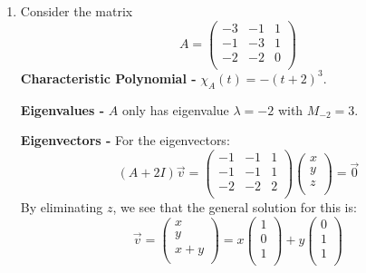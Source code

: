 \documentclass[../main.tex]{subfiles}
\begin{document}
\begin{example}
\begin{enumerate}
    From \textbf{iii}, we know the rotation in the plane has eigenvalues $e^{\pm i \theta}$.
    Provided $\theta \neq n\pi$, these are distinct and a complex conjugate pair so each have algebraic multiplicity and geometric multiplicity 1.
    Otherwise, if $\theta = n\pi$, then all vectors on the plane are eigenvectors with eigenvalue $\lambda = -1$ so $m_{-1} = 2$ and algebraic multiplicity $M_{-1} = 2$ as both $e^{+i\pi}$ and $e^{-i\pi}$ coincide.
  \item Consider the matrix
    \[
      A = \begin{pmatrix}
      -3 & -1 & 1 \\
      -1 & -3 & 1 \\
      -2 & -2 & 0 \\
      \end{pmatrix}
    \]
    \textbf{Characteristic Polynomial -} $\chi_A(t) = -(t + 2)^3$.\par
    \textbf{Eigenvalues -} $A$ only has eigenvalue $\lambda = -2$ with $M_{-2} = 3$.\par
    \textbf{Eigenvectors -} For the eigenvectors:
    \[
      (A + 2I) \vec{v} =
      \begin{pmatrix}
      -1 & -1 & 1 \\
      -1 & -1 & 1 \\
      -2 & -2 & 2 \\
      \end{pmatrix}
      \begin{pmatrix}
      x \\
      y \\
      z \\
      \end{pmatrix} = \vec{0}
    \]
    By eliminating $z$, we see that the general solution for this is:
    \[
      \vec{v} = \begin{pmatrix}
      x \\
      y \\
      x + y \\
      \end{pmatrix} =
      x \begin{pmatrix}
      1 \\
      0 \\
      1 \\
      \end{pmatrix} + y\begin{pmatrix}
      0 \\
      1 \\
      1 \\

\end{pmatrix}\]
\end{enumerate}
\end{example}
\end{document}
